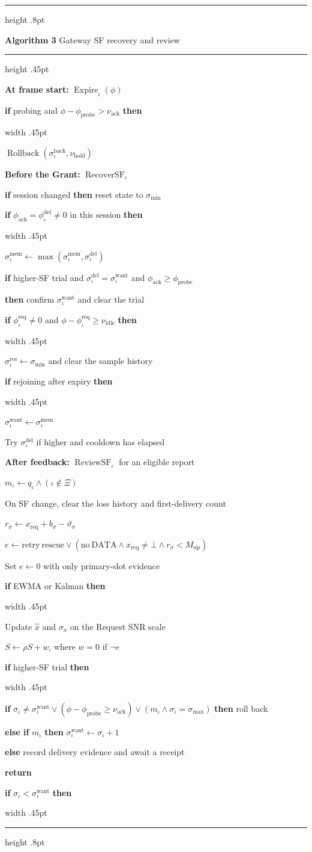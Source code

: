 \documentclass[11pt,multi=algorithm,border=6pt]{standalone}
\newenvironment{algorithm}[2]{%
  \begin{minipage}{252pt}
  \raggedright
  \setlength{\parindent}{0pt}%
  \setlength{\parskip}{2pt}%
  \hrule height .8pt\vspace{4pt}%
  {\large\textbf{Algorithm #1} \enspace #2\par}%
  \vspace{3pt}\hrule height .45pt\vspace{5pt}%
}{\par\vspace{5pt}\hrule height .8pt\end{minipage}}
\newcommand{\Step}[1]{\noindent #1\par}
\DeclareMathOperator{\Review}{ReviewSF}
\DeclareMathOperator{\Recover}{RecoverSF}
\DeclareMathOperator{\Rollback}{Rollback}
\DeclareMathOperator{\Expire}{Expire}
\newcommand{\Block}[2]{%
  \Step{#1}%
  \noindent\hspace{.75em}\vrule width .45pt\hspace{.65em}%
  \begin{minipage}[t]{\dimexpr\linewidth-1.4em-.45pt\relax}%
    \raggedright\setlength{\parskip}{2pt}#2%
  \end{minipage}\par%
}
\begin{document}
\begin{algorithm}{3}{Gateway SF recovery and review}
  \Step{\textbf{At frame start:} $\Expire_\iota(\phi)$}
  \Block{\textbf{if} probing and $\phi-\phi_{\mathrm{probe}}>\nu_{\mathrm{ack}}$ \textbf{then}}{%
    \Step{$\Rollback(\sigma^{\mathrm{back}}_\iota,\nu_{\mathrm{hold}})$}
  }
  \Step{\textbf{Before the Grant:} $\Recover_\iota$}
  \Step{\textbf{if} session changed \textbf{then} reset state to $\sigma_{\min}$}
  \Block{\textbf{if} $\phi_{\mathrm{ack}}=\phi^{\mathrm{del}}_\iota\ne 0$ in this session \textbf{then}}{%
    \Step{$\sigma^{\mathrm{mem}}_\iota\gets
      \max(\sigma^{\mathrm{mem}}_\iota,\sigma^{\mathrm{del}}_\iota)$}
    \Step{\textbf{if} higher-SF trial and
      $\sigma^{\mathrm{del}}_\iota=\sigma^{\mathrm{want}}_\iota$
      and $\phi_{\mathrm{ack}}\ge\phi_{\mathrm{probe}}$}
    \Step{\hspace{1em}\textbf{then} confirm $\sigma^{\mathrm{want}}_\iota$ and clear the trial}%
  }
  \Block{\textbf{if} $\phi^{\mathrm{req}}_\iota\ne0$ and $\phi-\phi^{\mathrm{req}}_\iota\ge\nu_{\mathrm{idle}}$ \textbf{then}}{%
    \Step{$\sigma^{\mathrm{res}}_\iota\gets\sigma_{\min}$ and clear the sample history}%
  }
  \Block{\textbf{if} rejoining after expiry \textbf{then}}{%
    \Step{$\sigma^{\mathrm{want}}_\iota\gets\sigma^{\mathrm{mem}}_\iota$}
    \Step{Try $\sigma^{\mathrm{del}}_\iota$ if higher and cooldown has elapsed}%
  }
  \vspace{3pt}
  \Step{\textbf{After feedback:} $\Review_\iota$ for an eligible report}
  \Step{$m_\iota\gets q_\iota\land(\iota\notin\Xi)$}
  \Step{On SF change, clear the loss history and first-delivery count}
  \Step{$r_\sigma\gets x_{\mathrm{req}}+b_\sigma-\vartheta_\sigma$}
  \Step{$e\gets\mathrm{retry\ rescue}\lor(\mathrm{no\ DATA}\land
      x_{\mathrm{req}}\ne\bot\land r_\sigma<M_{\mathrm{up}})$}
  \Step{Set $e\gets0$ with only primary-slot evidence}
  \Block{\textbf{if} EWMA or Kalman \textbf{then}}{%
    \Step{Update $\widehat{x}$ and $\sigma_x$ on the Request SNR scale}
    \Step{$S\gets\rho S+w$, where $w=0$ if $\neg e$}%
  }
  \Block{\textbf{if} higher-SF trial \textbf{then}}{%
    \Step{\textbf{if} $\sigma_\iota\ne\sigma^{\mathrm{want}}_\iota
      \lor(\phi-\phi_{\mathrm{probe}}\ge\nu_{\mathrm{ack}})
      \lor(m_\iota\land\sigma_\iota=\sigma_{\max})$ \textbf{then} roll back}
    \Step{\textbf{else if} $m_\iota$ \textbf{then} $\sigma^{\mathrm{want}}_\iota\gets\sigma_\iota+1$}
    \Step{\textbf{else} record delivery evidence and await a receipt}
    \Step{\textbf{return}}%
  }
  \Block{\textbf{if} $\sigma_\iota<\sigma^{\mathrm{want}}_\iota$ \textbf{then}}{%
}
\end{algorithm}
\end{document}
